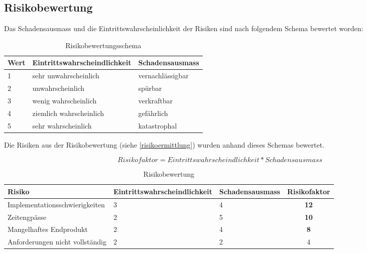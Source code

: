 \subsection{Risikobewertung}
Das Schadensausmass und die Eintrittswahrscheinlichkeit der Risiken sind nach folgendem Schema bewertet worden:

\begin{table}[ht]
\centering
  \begin{tabular}{ l | p{5cm} | p{5cm} }
	\hline
	\rowcolor{gray}
	\textbf{Wert}					&	\textbf{Eintrittswahrscheindlichkeit} &	\textbf{Schadensausmass}	\\ \hline			
	1							&	sehr unwahrscheinlich		&	vernachlässigbar	\\ \hline
	2							&	unwahrscheinlich			&	spürbar		\\ \hline
	3							&	wenig wahrscheinlich		&	verkraftbar		\\ \hline
	4							&	ziemlich wahrscheinlich		&	gefährlich		\\ \hline
	5							&	sehr wahrscheinlich			&	katastrophal		\\ \hline
  \end{tabular}
   \caption{Risikobewertungsschema}
\end{table}

\FloatBarrier
Die Risiken aus der Risikobewertung (siehe \ref{risikoermittlung}) wurden anhand dieses Schemas bewertet.

\begin{equation*}
Risikofaktor = Eintrittswahrscheindlichkeit * Schadensausmass
\end{equation*}

\begin{table}[ht]
\centering
  \begin{tabular}{ l | p{4cm} | p{3cm} | c }
	\hline
	\rowcolor{gray}
	\textbf{Risiko}					&	\textbf{Eintrittswahrscheindlichkeit} &	\textbf{Schadensausmass} 	&	\textbf{Risikofaktor}\\ \hline			
	Implementationsschwierigkeiten			&	3					&	4			&	\textbf{12}	\\ \hline
	Zeitengpässe					&	2					&	5			&	\textbf{10}	\\ \hline
	Mangelhaftes Endprodukt				&	2					&	4			&	\textbf{8}	\\ \hline
	Anforderungen nicht vollständig			&	2					&	2			&	4		\\ \hline
  \end{tabular}
   \caption{Risikobewertung}
\end{table}

